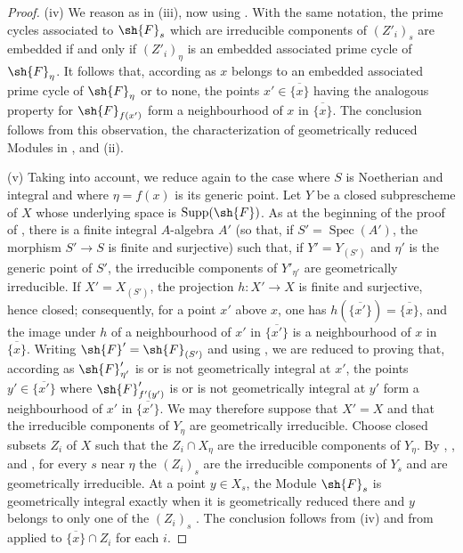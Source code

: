 \begin{proof}
(iv) We reason as in (iii), now using .
With the same notation, the prime cycles associated to $\sh{F}_s$ which are irreducible components of $(Z'_i)_s$ are embedded if and only if $(Z'_i)_\eta$ is an embedded associated prime cycle of $\sh{F}_\eta$.
It follows that, according as $x$ belongs to an embedded associated prime cycle of $\sh{F}_\eta$ or to none, the points $x'\in\overline{\{x\}}$ having the analogous property for $\sh{F}_{f(x')}$ form a neighbourhood of $x$ in $\overline{\{x\}}$.
The conclusion follows from this observation, the characterization of geometrically reduced Modules in , and (ii).

(v) Taking  into account, we reduce again to the case where $S$ is Noetherian and integral and where $\eta=f(x)$ is its generic point.
Let $Y$ be a closed subprescheme of $X$ whose underlying space is $\operatorname{Supp}(\sh{F})$.
As at the beginning of the proof of , there is a finite integral $A$-algebra $A'$ (so that, if $S'=\operatorname{Spec}(A')$, the morphism $S'\to S$ is finite and surjective) such that, if $Y'=Y_{(S')}$ and $\eta'$ is the generic point of $S'$, the irreducible components of $Y'_{\eta'}$ are geometrically irreducible.
If $X'=X_{(S')}$, the projection $h:X'\to X$ is finite and surjective, hence closed; consequently, for a point $x'$ above $x$, one has $h(\overline{\{x'\}})=\overline{\{x\}}$, and the image under $h$ of a neighbourhood of $x'$ in $\overline{\{x'\}}$ is a neighbourhood of $x$ in $\overline{\{x\}}$.
Writing $\sh{F}'=\sh{F}_{(S')}$ and using , we are reduced to proving that, according as $\sh{F}'_{\eta'}$ is or is not geometrically integral at $x'$, the points $y'\in\overline{\{x'\}}$ where $\sh{F}'_{f'(y')}$ is or is not geometrically integral at $y'$ form a neighbourhood of $x'$ in $\overline{\{x'\}}$.
We may therefore suppose that $X'=X$ and that the irreducible components of $Y_\eta$ are geometrically irreducible.
Choose closed subsets $Z_i$ of $X$ such that the $Z_i\cap X_\eta$ are the
  irreducible components of $Y_\eta$.
By , , and , for every $s$ near $\eta$ the $(Z_i)_s$ are the irreducible components of $Y_s$ and are geometrically irreducible.
At a point $y\in X_s$, the Module $\sh{F}_s$ is geometrically integral exactly when it is geometrically reduced there and $y$ belongs to only one of the $(Z_i)_s$ .
The conclusion follows from (iv) and from  applied to $\overline{\{x\}}\cap Z_i$ for each $i$.


\end{proof}
